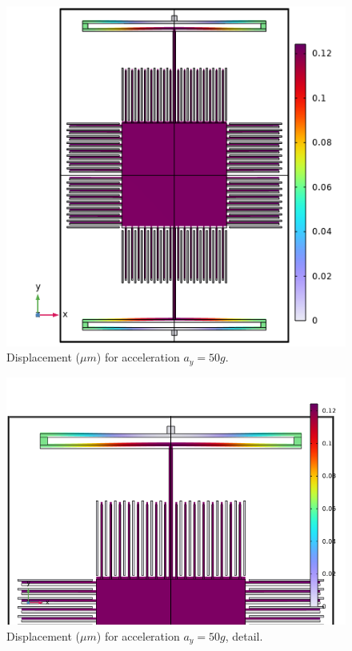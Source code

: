\documentclass[lettersize,journal]{IEEEtran}
\begin{document}
    \begin{figure}[!h]
        \centering
        \includegraphics[width=1.0\linewidth]{displacement_ay}
        \caption{Displacement (\(\mu m\)) for acceleration \(a_y=50g\).}
        \label{fig:disp_ay}
    \end{figure}
    
    \begin{figure}[!h]
        \centering
        \includegraphics[width=1.0\linewidth]{displacement_ay_detail}
        \caption{Displacement (\(\mu m\)) for acceleration \(a_y=50g\), detail.}
        \label{fig:disp_ay_det}
    \end{figure}
    
\end{document}
